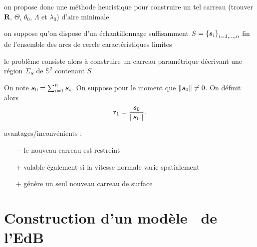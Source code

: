	\item on propose donc une méthode heuristique pour construire un tel carreau (\ie trouver $\mathbf{R}$, $\Theta$, $\theta_0$, $\Lambda$ et $\lambda_0$) d'aire minimale
	\item on suppose qu'on dispose d'un échantillonnage suffisamment $S = \left\{{\bm{s}}_{i}\right\}_{{i}={1},\ldots,{n}}$ fin de l'ensemble des arcs de cercle caractéristiques limites
	\item le problème consiste alors à construire un carreau paramétrique décrivant une région $\Sigma_S$ de $\mathbb{S}^2$ contenant $S$
	
	\item On note $\bm{s}_{0} = \sum_{i = 1}^n \bm{s}_i$. 
	On suppose pour le moment que $\left\| {\bm{s}_{0}} \right\| \neq 0$. 
	On définit alors 
	\begin{equation}
	    \mathbf{r}_1 = \frac{ \bm{s}_{0} }{\left\| { \bm{s}_{0} } \right\|}.
	\end{equation}
	

avantages/inconvénients :
\begin{itemize}
	\item[$-$] le nouveau carreau est restreint
	\item[$+$] valable également si la vitesse normale varie spatialement
	\item[$+$] génère un seul nouveau carreau de surface
\end{itemize}





\section{Construction d'un modèle \brep\ de l'EdB}

